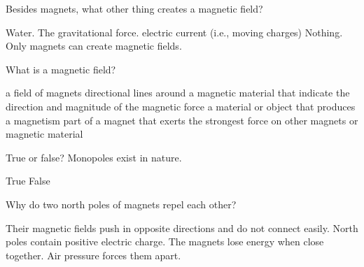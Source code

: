 \documentclass[]{exam}
\begin{document}
\begin{questions}
\question
Besides magnets, what other thing creates a magnetic field?

\begin{randomizechoices}[norandomize]
\choice Water.
\choice The gravitational force.
\CorrectChoice electric current (i.e., moving charges)
\choice Nothing. Only magnets can create magnetic fields.
\end{randomizechoices}



\question
What is a magnetic field?

\begin{randomizechoices}
\choice a field of magnets
\CorrectChoice directional lines around a magnetic material that indicate the direction and magnitude of the magnetic force
\choice a material or object that produces a magnetism
\choice part of a magnet that exerts the strongest force on other magnets or magnetic material
\end{randomizechoices}


\question
True or false? Monopoles exist in nature.

\begin{randomizechoices}[norandomize]
    \choice True
    \correctchoice False 
\end{randomizechoices}

\question
Why do two north poles of magnets repel each other?

\begin{randomizechoices}
    \correctchoice Their magnetic fields push in opposite directions and do not connect easily.
    \choice North poles contain positive electric charge.
    \choice The magnets lose energy when close together.
    \choice Air pressure forces them apart.
\end{randomizechoices}






\end{questions}
\end{document}
